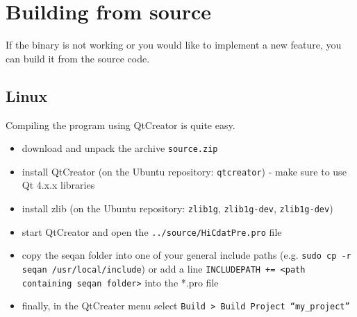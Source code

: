 \documentclass[a4paper,10pt]{article}
\begin{document}
\section{Building from source}\label{buildInstructions}
If the binary is not working or you would like to implement a new feature, you can build it from the source code. 
\subsection{Linux}
Compiling the program using QtCreator is quite easy.
\begin{itemize}
\item download and unpack the archive \texttt{source.zip}
\item install QtCreator (on the Ubuntu repository: \texttt{qtcreator}) - make sure to use Qt 4.x.x libraries
\item install zlib (on the Ubuntu repository: \texttt{zlib1g}, \texttt{zlib1g-dev}, \texttt{zlib1g-dev})
\item start QtCreator and open the \texttt{../source/HiCdatPre.pro} file 
\item copy the seqan folder into one of your general include paths (e.g. \texttt{sudo cp -r seqan /usr/local/include}) or add a line \texttt{INCLUDEPATH += <path containing seqan folder>} into the *.pro file
\item finally, in the QtCreater menu select \texttt{Build > Build Project ``my\_project''}
\end{itemize}
\end{document}
